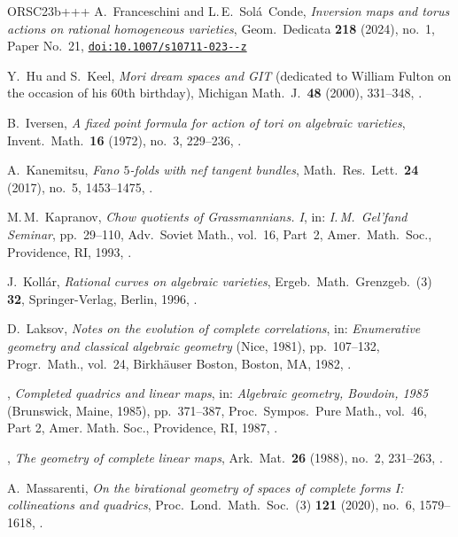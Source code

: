 \documentclass[11pt]{amsart}
\numberwithin{equation}{section}
\theoremstyle{definition}
\theoremstyle{remark}
\begin{document}
\begin{thebibliography}{ORSC\etalchar{+}23b+++}
A.~Franceschini and L.\,E.~Sol\'{a}~Conde, 
\emph{Inversion maps and torus actions on rational homogeneous va\-ri\-e\-ties}, Geom.\ Dedicata \textbf{218} (2024), no.~1,
Paper No.~21, \href{https://doi.org/10.1007/s10711-023-00866-z}{\texttt{doi:10.1007/s10711-023--z}}

Y.~Hu and S.~Keel,
\emph{Mori dream spaces and GIT} (dedicated to William Fulton on the occasion of his 60th birthday),
Michigan Math.~J.\ \textbf{48} (2000), 331--348,
.

B.~Iversen, 
\emph{A fixed point formula for action of tori on algebraic varieties},
Invent.\ Math.\ \textbf{16} (1972), no.~3, 229--236,
.

A.~Kanemitsu,
\emph{Fano $5$-folds with nef tangent bundles}, 
Math.\ Res.\ Lett.\ \textbf{24} (2017), no.~5, 1453--1475,
.

M.\,M.~Kapranov, 
\emph{Chow quotients of Grassmannians. {I}},
in: \emph{I.\,{M}.~{G}el'fand {S}eminar},  pp.~29--110,  Adv.\ Soviet
Math., vol.~16, Part~2,
Amer.\ Math.\ Soc., Providence, RI, 1993,
.

J.~Koll{\'a}r, 
\emph{Rational curves on algebraic varieties},
Ergeb.\ Math.\ Grenzgeb.\ (3) \textbf{32}, Springer-Verlag, Berlin, 1996, 
  . 

D.~Laksov, 
\emph{Notes on the evolution of complete correlations}, 
in: \emph{Enumerative geometry and classical algebraic geometry}
  ({N}ice, 1981), pp.~107--132, Progr.\ Math., vol.~24, 
Birkh\"auser Boston, Boston, MA, 1982,
.

\bysame,
\emph{Completed quadrics and linear maps}, 
 in: \emph{Algebraic geometry, {B}owdoin, 1985} ({B}runswick, {M}aine,
  1985), pp.~371--387, Proc.\ Sympos.\ Pure Math., vol.~46, Part 2,
  Amer. Math. Soc., Providence, RI, 1987,
  .

\bysame, 
\emph{The geometry of complete linear maps}, 
Ark.\ Mat.\  \textbf{26} (1988), no.~2, 231--263,
.

A.~Massarenti, 
\emph{On the birational geometry of spaces of complete forms {I}:
  collineations and quadrics}, 
Proc.\ Lond.\ Math.\ Soc.~(3) \textbf{121} (2020), no.~6, 1579--1618,
.


\end{thebibliography}
\end{document}
